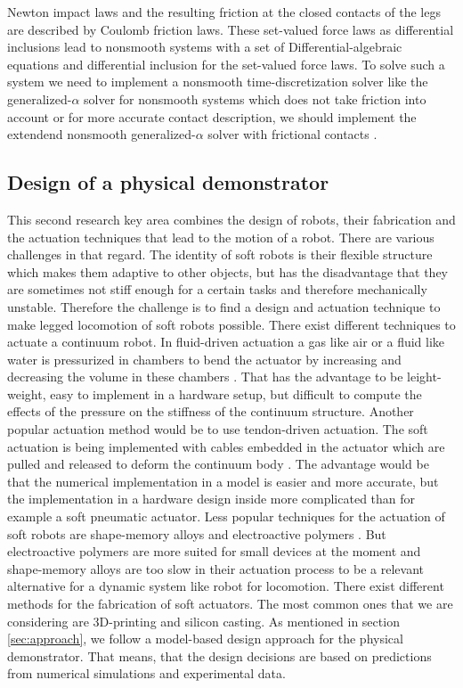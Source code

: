 Newton impact laws and the resulting friction at the closed contacts of the legs are described by Coulomb friction laws. These set-valued force laws \cite{Glocker2001_book} as differential inclusions
lead to nonsmooth systems with a set of Differential-algebraic equations and differential inclusion for the set-valued force laws. To solve such a system we need to implement a nonsmooth time-discretization solver
like the generalized-$\alpha$ solver for nonsmooth systems \cite{Arnold2007, Bruels2018} which does not take friction into account or for more accurate contact description, we should
implement the extendend nonsmooth generalized-$\alpha$ solver with frictional contacts \cite{Capobianco2021}.
%
\subsection*{Design of a physical demonstrator} \label{sub:Design}
%
This second research key area combines the design of robots, their fabrication and the actuation techniques that lead to the motion of a robot. There are various challenges in that regard.
The identity of soft robots is their flexible structure which makes them adaptive to other objects, but has the disadvantage that they are sometimes not stiff enough for a certain tasks
 and therefore mechanically unstable. Therefore the challenge is to find a design and actuation technique to make legged locomotion of soft robots possible. There exist different techniques to
 actuate a continuum robot. In fluid-driven actuation a gas like air or a fluid like water is pressurized in chambers to bend the actuator by increasing and decreasing the volume in these
chambers \cite{Polygerinos2017,Gorissen2017}. That has the advantage to be leight-weight, easy to implement in a hardware setup, but difficult to compute the effects of the pressure on the 
stiffness of the continuum structure. Another popular actuation method would be to use tendon-driven actuation. The soft actuation is being implemented with cables embedded in the actuator which are pulled
and released to deform the continuum body \cite{Calisti2011,Chen2018}. The advantage would be that the numerical implementation in a model is easier and more accurate, but the implementation in a hardware design inside
more complicated than for example a soft pneumatic actuator.
Less popular techniques for the actuation of soft robots are shape-memory alloys \cite{Jin2016} and electroactive polymers \cite{Gu2017}. But electroactive polymers are more suited for small devices at the moment
and shape-memory alloys are too slow in their actuation process to be a relevant alternative for a dynamic system like robot for locomotion.
%
There exist different methods for the fabrication of soft actuators. The most common ones that we are considering are 3D-printing and silicon casting. 
%
As mentioned in section \ref{sec:approach}, we follow a model-based design approach for the physical demonstrator. That means, that the design decisions are based on predictions 
from numerical simulations and experimental data. 
